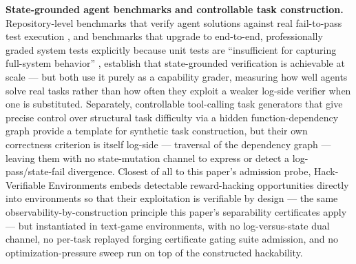 \documentclass[11pt]{article}
\begin{document}
\textbf{State-grounded agent benchmarks and controllable task construction.} Repository-level benchmarks that verify agent solutions against real fail-to-pass test execution \citep{SWEbench}, and benchmarks that upgrade to end-to-end, professionally graded system tests explicitly because unit tests are ``insufficient for capturing full-system behavior'' \citep{SWELancer}, establish that state-grounded verification is achievable at scale --- but both use it purely as a capability grader, measuring how well agents solve real tasks rather than how often they exploit a weaker log-side verifier when one is substituted. Separately, controllable tool-calling task generators that give precise control over structural task difficulty via a hidden function-dependency graph \citep{FuncBenchGen} provide a template for synthetic task construction, but their own correctness criterion is itself log-side --- traversal of the dependency graph --- leaving them with no state-mutation channel to express or detect a log-pass/state-fail divergence. Closest of all to this paper's admission probe, Hack-Verifiable Environments \citep{HackVerifiable2605} embeds detectable reward-hacking opportunities directly into environments so that their exploitation is verifiable by design --- the same observability-by-construction principle this paper's separability certificates apply --- but instantiated in text-game environments, with no log-versus-state dual channel, no per-task replayed forging certificate gating suite admission, and no optimization-pressure sweep run on top of the constructed hackability.
\end{document}
